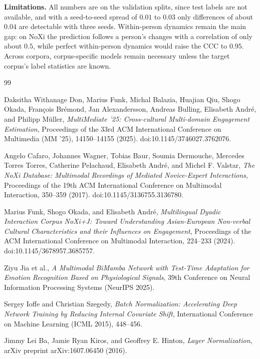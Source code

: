 \documentclass[10pt,a4paper,twocolumn]{article}
\begin{document}
	\textbf{Limitations.} All numbers are on the validation splits, since test labels are not available, and with a seed-to-seed spread of $0.01$ to $0.03$ only differences of about $0.04$ are detectable with three seeds. Within-person dynamics remain the main gap: on NoXi the prediction follows a person's changes with a correlation of only about $0.5$, while perfect within-person dynamics would raise the CCC to $0.95$. Across corpora, corpus-specific models remain necessary unless the target corpus's label statistics are known.

	\newpage
	\begin{thebibliography}{99}
		
		Daksitha Withanage Don, Marius Funk, Michal Balazia, Huajian Qiu, Shogo Okada, Fran\c{c}ois Br\'{e}mond, Jan Alexandersson, Andreas Bulling, Elisabeth Andr\'{e}, and Philipp M\"{u}ller, \emph{MultiMediate '25: Cross-cultural Multi-domain Engagement Estimation}, Proceedings of the 33rd ACM International Conference on Multimedia (MM '25), 14150--14155 (2025). doi:10.1145/3746027.3762076.
		
		Angelo Cafaro, Johannes Wagner, Tobias Baur, Soumia Dermouche, Mercedes Torres Torres, Catherine Pelachaud, Elisabeth Andr\'{e}, and Michel F. Valstar, \emph{The NoXi Database: Multimodal Recordings of Mediated Novice-Expert Interactions}, Proceedings of the 19th ACM International Conference on Multimodal Interaction, 350--359 (2017). doi:10.1145/3136755.3136780.
		
		Marius Funk, Shogo Okada, and Elisabeth Andr\'{e}, \emph{Multilingual Dyadic Interaction Corpus NoXi+J: Toward Understanding Asian-European Non-verbal Cultural Characteristics and their Influences on Engagement}, Proceedings of the ACM International Conference on Multimodal Interaction, 224--233 (2024). doi:10.1145/3678957.3685757.
		
		Ziyu Jia et al., \emph{A Multimodal BiMamba Network with Test-Time Adaptation for Emotion Recognition Based on Physiological Signals}, 39th Conference on Neural Information Processing Systems (NeurIPS 2025).
		
		Sergey Ioffe and Christian Szegedy, \emph{Batch Normalization: Accelerating Deep Network Training by Reducing Internal Covariate Shift}, International Conference on Machine Learning (ICML 2015), 448--456.
		
		Jimmy Lei Ba, Jamie Ryan Kiros, and Geoffrey E. Hinton, \emph{Layer Normalization}, arXiv preprint arXiv:1607.06450 (2016).
		

\end{thebibliography}
\end{document}
